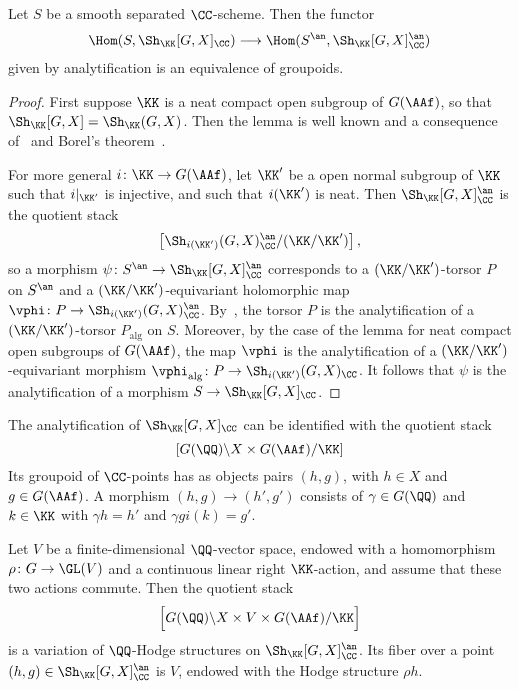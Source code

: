 \begin{lemma}\label{lem:baily_borel}
Let $S$ be a smooth separated $\CC$-scheme. Then the functor
$$
    \Hom(S,\Sh_{\KK}[G,X]_{\CC}) \longrightarrow \Hom(S^{\an},\Sh_{\KK}[G,X]_{\CC}^{\an})
$$
given by analytification is an equivalence of groupoids.
\end{lemma}
\begin{proof}
First suppose $\KK$ is a neat compact open subgroup of $G(\AAf)$, so that $\Sh_{\KK}[G,X] = \Sh_{\KK}(G,X)$. Then the lemma is well known and a consequence of~\cite[Lemma~5.13]{MilneShimura} and Borel's theorem~\cite[Theorem 3.14]{MilneShimura}.

For more general $i\colon \KK \rightarrow G(\AAf)$, let $\KK'$ be a open normal subgroup of $\KK$ such that $i|_{\KK'}$ is injective, and such that $i(\KK')$ is neat. Then $\Sh_{\KK}[G,X]_{\CC}^{\an}$ is the quotient stack
$$
\left[ \Sh_{i(\KK')}(G,X)_{\CC}^{\an}/(\KK/\KK') \right],
$$
so a morphism $\psi\colon S^{\an} \rightarrow \Sh_{\KK}[G,X]_{\CC}^{\an}$ corresponds to a $(\KK/\KK')$-torsor $P$ on $S^{\an}$ and a $(\KK/\KK')$-equivariant holomorphic map $\vphi\colon P \rightarrow \Sh_{i(\KK')}(G,X)_{\CC}^{\an}$. By~\cite[Corollaire~XII.5.2]{SGA1}, the torsor $P$ is the analytification of a $(\KK/\KK')$-torsor $P_{\text{alg}}$ on $S$. Moreover, by the case of the lemma for neat compact open subgroups of $G(\AAf)$, the map $\vphi$ is the analytification of a $(\KK/\KK')$-equivariant morphism $\vphi_{\text{alg}}\colon P \rightarrow \Sh_{i(\KK')}(G,X)_{\CC}$. It follows that $\psi$ is the analytification of a morphism $S \rightarrow \Sh_{\KK}[G,X]_{\CC}$.
\end{proof}

The analytification of $\Sh_{\KK}[G,X]_{\CC}$ can be identified with the quotient stack
$$
\left[ G(\QQ) \backslash X \times G(\AAf) / \KK \right]
$$
Its groupoid of $\CC$-points has as objects pairs $(h,g)$, with $h \in X$ and $g \in G(\AAf)$. A morphism $(h,g) \rightarrow (h',g')$ consists of $\gamma \in G(\QQ)$ and $k \in \KK$ with $\gamma h = h'$ and $\gamma g i(k) = g'$.

Let $V$ be a finite-dimensional $\QQ$-vector space, endowed with a homomorphism $\rho\colon G \rightarrow \GL(V)$ and a continuous linear right $\KK$-action, and assume that these two actions commute. Then the quotient stack
$$
\Big[ G(\QQ) \backslash X \times V \times G(\AAf) / \KK \Big]
$$
is a variation of $\QQ$-Hodge structures on $\Sh_{\KK}[G,X]_{\CC}^{\an}$. Its fiber over a point $(h,g) \in \Sh_{\KK}[G,X]_{\CC}^{\an}$ is $V$, endowed with the Hodge structure $\rho h$.

